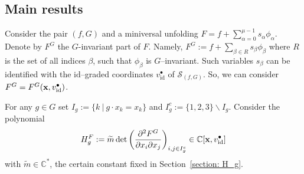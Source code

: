 \documentclass[reqno,12pt]{amsart}
\numberwithin{equation}{section}
\theoremstyle{plain}
\def\p{\partial }
\theoremstyle{definition}
\newcommand{\CC}{{\mathbb{C}}}
\newcommand{\id}{\mathrm{id}}
\newcommand{\bx}{{\bf x}}
\numberwithin{equation}{section}
\begin{document}
\subsection*{Main results} 
Consider the pair $(f,G)$ and a miniversal unfolding $F = f + \sum_{\alpha=0}^{\mu-1} s_{\alpha}\phi_\alpha$.
Denote by $F^G$ the $G$-invariant part of $F$. Namely, $F^G := f + \sum_{\beta \in R} s_{\beta}\phi_\beta$ where $R$ is the set of all indices $\beta$, such that $\phi_\beta$ is $G$--invariant. Such variables $s_\beta$ can be identified with the $\id$--graded coordinates $v^\bullet_{\id}$ of $\mathcal{S}_{(f,G)}$. So, we can consider $F^G = F^G(\bx,v_\id^\bullet)$.

For any $g \in G$ set $I_g := \lbrace k \ | \ g \cdot x_k = x_k \rbrace $ and $I_g^c := \lbrace 1,2,3 \rbrace \backslash I_g$. Consider the polynomial
\[
    H_g^F := \widetilde m \det \left( \frac{\p^2 F^G}{\p x_i \p x_j} \right)_{i,j \in I_g^c} \in \CC[\bx,v_\id^\bullet]
\]
with $\widetilde m \in \CC^\ast$, the certain constant fixed in Section~\ref{section: H_g}.
\end{document}
